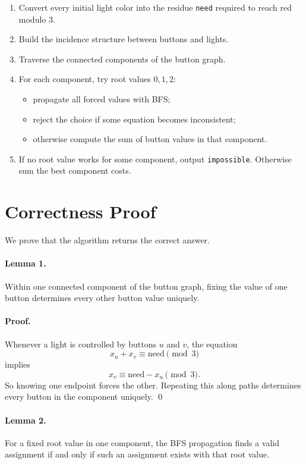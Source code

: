 \documentclass[11pt]{article}
\begin{document}
\begin{enumerate}[leftmargin=*]
    \item Convert every initial light color into the residue \texttt{need} required to reach red modulo $3$.
    \item Build the incidence structure between buttons and lights.
    \item Traverse the connected components of the button graph.
    \item For each component, try root values $0,1,2$:
    \begin{itemize}[leftmargin=*]
        \item propagate all forced values with BFS;
        \item reject the choice if some equation becomes inconsistent;
        \item otherwise compute the sum of button values in that component.
    \end{itemize}
    \item If no root value works for some component, output \texttt{impossible}. Otherwise sum the best
    component costs.
\end{enumerate}

\section*{Correctness Proof}

We prove that the algorithm returns the correct answer.

\paragraph{Lemma 1.}
Within one connected component of the button graph, fixing the value of one button determines every
other button value uniquely.

\paragraph{Proof.}
Whenever a light is controlled by buttons $u$ and $v$, the equation
\[
x_u+x_v \equiv \text{need} \pmod 3
\]
implies
\[
x_v \equiv \text{need}-x_u \pmod 3.
\]
So knowing one endpoint forces the other. Repeating this along paths determines every button in the
component uniquely. \qed

\paragraph{Lemma 2.}
For a fixed root value in one component, the BFS propagation finds a valid assignment if and only if such
an assignment exists with that root value.
\end{document}
